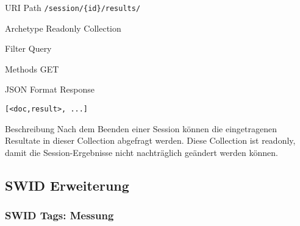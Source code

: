 \documentclass[10pt,a4paper]{scrartcl}
\begin{document}
\begin{mdframed}[style=def]
\begin{description*}
	\item[URI Path] \texttt{/session/\{id\}/results/}
	\item[Archetype] Readonly Collection
	\item[Filter Query] \hfill
	\item[Methods] GET
	\item[JSON Format Response] \hfill
\begin{lstlisting}
[<doc,result>, ...]
\end{lstlisting}
	\item[Beschreibung] Nach dem Beenden einer Session können die eingetragenen Resultate in dieser Collection abgefragt werden. Diese Collection ist readonly, damit die Session-Ergebnisse nicht nachträglich geändert werden können.
\end{description*}
\end{mdframed}




\pagebreak
\subsection{SWID Erweiterung}

\subsubsection{SWID Tags: Messung}
\end{document}
